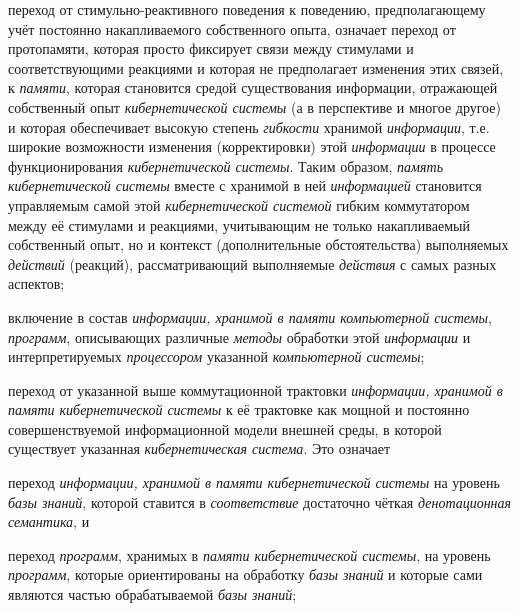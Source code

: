 \begin{scnsubstruct}
{\begin{scnitemize}
            \item переход от стимульно-реактивного поведения к поведению, предполагающему учёт постоянно накапливаемого собственного опыта, означает переход от протопамяти, которая просто фиксирует связи между стимулами и соответствующими реакциями и которая не предполагает изменения этих связей, к \textit{памяти}, которая становится средой существования информации, отражающей  собственный опыт \textit{кибернетической системы} (а в перспективе и многое другое) и которая обеспечивает высокую степень \textit{гибкости} хранимой \textit{информации}, т.е. широкие возможности изменения (корректировки) этой \textit{информации} в процессе функционирования \textit{кибернетической системы}. Таким образом, \textit{память кибернетической системы} вместе с хранимой в ней \textit{информацией} становится управляемым самой этой \textit{кибернетической системой} гибким коммутатором между её стимулами и реакциями, учитывающим не только накапливаемый собственный опыт, но и контекст (дополнительные обстоятельства) выполняемых \textit{действий} (реакций), рассматривающий выполняемые \textit{действия} с самых разных аспектов;
            \item включение в состав \textit{информации, хранимой в памяти компьютерной системы}, \textit{программ}, описывающих различные \textit{методы} обработки этой \textit{информации} и интерпретируемых \textit{процессором} указанной \textit{компьютерной системы};
            \item переход от указанной выше коммутационной трактовки \textit{информации, хранимой в памяти кибернетической системы} к её трактовке как мощной и постоянно совершенствуемой информационной модели внешней среды, в которой существует указанная \textit{кибернетическая система}. Это означает\begin{scnitemizeii}

                \item переход \textit{информации, хранимой в памяти кибернетической системы} на уровень \textit{базы знаний}, которой ставится в \textit{соответствие} достаточно чёткая \textit{денотационная семантика}, и
                \item переход \textit{программ}, хранимых в \textit{памяти кибернетической системы}, на уровень \textit{программ}, которые ориентированы на обработку \textit{базы знаний} и которые сами являются частью обрабатываемой \textit{базы знаний};\end{scnitemizeii}


\end{scnitemize}}
\end{scnsubstruct}
